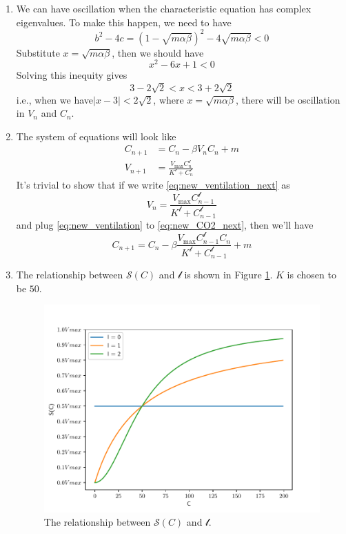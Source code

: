 \begin{homeworkProblem}
\begin{enumerate}
\item We can have oscillation when the characteristic equation has complex
eigenvalues. To make this happen, we need to have \[
    b^2 - 4c = (1 - \sqrt{m\alpha\beta})^2 - 4\sqrt{m\alpha\beta} < 0
\]
Substitute $x = \sqrt{m\alpha\beta}$, then we should have \[
    x^2 - 6x + 1 < 0
\]
Solving this inequity gives \[
    3 - 2\sqrt{2} < x < 3+2\sqrt{2}
\]i.e., when we have$|x-3| < 2\sqrt{2}$, where $x = \sqrt{m\alpha\beta}$, there
will be oscillation in $V_n$ and $C_n$.

\item The system of equations will look like \begin{align}
    C_{n+1} &= C_n - \beta V_nC_n + m \label{eq:new_CO2_next}\\
    V_{n+1} &= \frac{V_{\max}C^\mathcal{l}_n}{K^{\mathcal{l}}+C^\mathcal{l}_{n}}
    \label{eq:new_ventilation_next}
\end{align}
It's trivial to show that if we write \eqref{eq:new_ventilation_next} as
\begin{equation}
    V_{n} = \frac{
        V_{\max}C^\mathcal{l}_{n-1}}{K^{\mathcal{l}}+C^\mathcal{l}_{n-1}}
    \label{eq:new_ventilation}
\end{equation}
and plug \eqref{eq:new_ventilation} to \eqref{eq:new_CO2_next}, then we'll have
\begin{equation}
    C_{n+1} = C_n - \beta \frac{
        V_{\max}C^\mathcal{l}_{n-1}C_n}{K^{\mathcal{l}}+C^\mathcal{l}_{n-1}}
        + m
\end{equation}

\item The relationship between $\mathcal{S}(C)$ and $\mathcal{l}$ is shown in
Figure \ref{fig:CO2_sensitivity}. $K$ is chosen to be $50$.
\begin{figure}
    \centering
    \caption[The relationship between $\mathcal{S}(C)$ and $\mathcal{l}$]{
        The relationship between $\mathcal{S}(C)$ and $\mathcal{l}$.
    }
    \label{fig:CO2_sensitivity}
    \includegraphics[scale=0.6]{fig/fig17(f).pdf}
\end{figure}


\end{enumerate}
\end{homeworkProblem}
